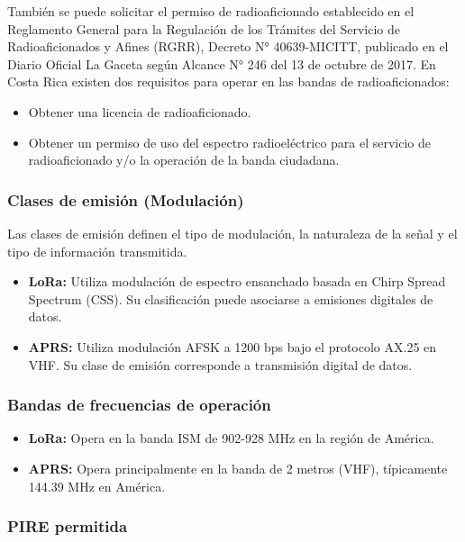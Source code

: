 \documentclass[conference]{IEEEtran}
\begin{document}
También se puede solicitar el permiso de radioaficionado establecido en el Reglamento General para la Regulación de los Trámites del Servicio de Radioaficionados y Afines (RGRR), Decreto N° 40639-MICITT, publicado en el Diario Oficial La Gaceta según Alcance N° 246 del 13 de octubre de 2017. En Costa Rica existen dos requisitos para operar en las bandas de radioaficionados:

\begin{itemize}
    \item Obtener una licencia de radioaficionado.
    \item Obtener un permiso de uso del espectro radioeléctrico para el servicio de radioaficionado y/o la operación de la banda ciudadana.
\end{itemize}

\subsubsection{Clases de emisión (Modulación)}

Las clases de emisión definen el tipo de modulación, la naturaleza de la señal y el tipo de información transmitida.

\begin{itemize}
    \item \textbf{LoRa:} Utiliza modulación de espectro ensanchado basada en Chirp Spread Spectrum (CSS). Su clasificación puede asociarse a emisiones digitales de datos.
    \item \textbf{APRS:} Utiliza modulación AFSK a 1200 bps bajo el protocolo AX.25 en VHF. Su clase de emisión corresponde a transmisión digital de datos.
\end{itemize}

\subsubsection{Bandas de frecuencias de operación}

\begin{itemize}
    \item \textbf{LoRa:} Opera en la banda ISM de 902-928 MHz en la región de América.
    \item \textbf{APRS:} Opera principalmente en la banda de 2 metros (VHF), típicamente 144.39 MHz en América.
\end{itemize}

\subsubsection{PIRE permitida}
\end{document}
